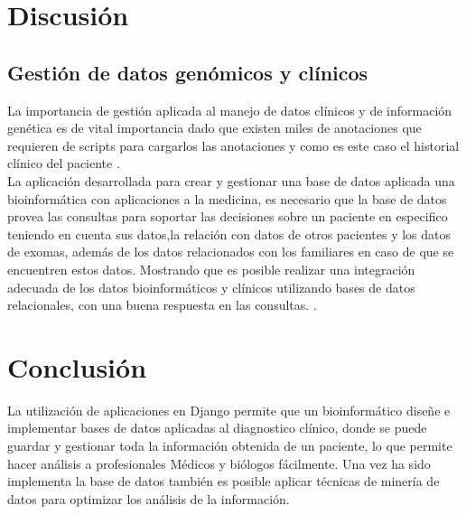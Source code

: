 \section{Discusión}

\subsection*{Gestión de datos genómicos y clínicos}

La importancia de gestión aplicada al manejo de datos clínicos y de información genética es de vital importancia dado que existen miles de anotaciones que requieren de scripts para cargarlos las anotaciones y como es este caso el historial clínico del paciente \cite{Paila2013}. \\

La aplicación desarrollada para crear y gestionar una base de datos aplicada una bioinformática con aplicaciones a la medicina, es necesario que la base de datos provea las consultas para soportar las decisiones sobre un paciente en especifico teniendo en cuenta sus datos,la relación con datos de otros pacientes y los datos de exomas, además de los datos relacionados con los familiares en caso de que se encuentren estos datos. Mostrando que es posible realizar una integración adecuada de los datos bioinformáticos y clínicos utilizando bases de datos relacionales, con una buena respuesta en las consultas. \cite{Sujansky2001}.

\section{Conclusión}

La utilización de aplicaciones en Django permite que un bioinformático diseñe e implementar bases de datos aplicadas al diagnostico clínico, donde se puede guardar y gestionar toda la información obtenida de un paciente, lo que permite hacer análisis a profesionales Médicos y biólogos fácilmente. Una vez ha sido implementa la base de datos también es posible aplicar técnicas de minería de datos para optimizar los análisis de la información. \\